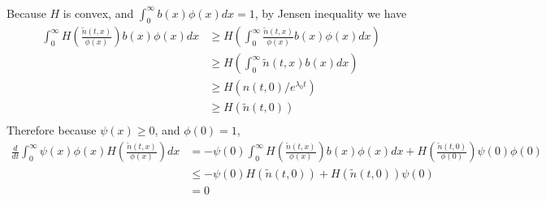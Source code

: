 \documentclass[pdf]{article}
\begin{document}
\begin{itemize}
\begin{align*}
\end{align*}
Because $H$ is convex, and $\int_0^\infty b(x)\phi(x)dx = 1$, by Jensen inequality we have
\begin{align*}
\int_0^\infty H\left(\frac{\tilde{n}(t,x)}{\phi(x)}\right)b(x)\phi(x)dx &\geq H\left(\int_0^\infty \frac{\tilde{n}(t,x)}{\phi(x)}b(x)\phi(x)dx\right)\\
                                                                                                              &\geq H\left(\int_0^\infty \tilde{n}(t,x)b(x)dx\right)\\
                                                                                                              &\geq H\left(n(t,0)/e^{\lambda_0t}\right)\\
                                                                                                              &\geq H\left(\tilde{n}(t,0)\right)\\
\end{align*}
Therefore because $\psi(x)\geq 0$, and $\phi(0) = 1$,
\begin{align*}
\frac{d}{dt}\int_0^\infty\psi(x)\phi(x)H\left(\frac{\tilde{n}(t,x)}{\phi(x)}\right)dx &= -\psi(0)\int_0^\infty H\left(\frac{\tilde{n}(t,x)}{\phi(x)}\right)b(x)\phi(x)dx + H\left(\frac{\tilde{n}(t,0)}{\phi(0)}\right)\psi(0)\phi(0)\\
                                                                                                                                     &\leq -\psi(0)H\left(\tilde{n}(t,0)\right) + H\left(\tilde{n}(t,0)\right)\psi(0)\\
                                                                                                                                     & = 0
\end{align*}


\end{itemize}
\end{document}
